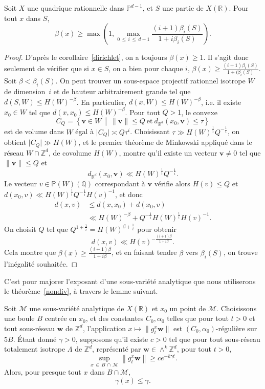 \documentclass[AHL,Unicode,longabstracts,francais,published]{cedram}
\newcommand{\abs}[1]{\lvert#1\rvert}
\newcommand{\norm}[1]{\lVert#1\rVert}
\newcommand{\R}{\mathbb{R}}
\newcommand{\Z}{\mathbb{Z}}
\newcommand{\Q}{\mathbb{Q}}
\newcommand{\PP}{\mathbb{P}}
\newcommand{\bw}{\mathbf{w}}
\newcommand{\bv}{\mathbf{v}}
\newcommand{\cM}{\mathcal{M}}
\begin{document}
\begin{prop}\label{dirichlet-fort}
Soit $X$ une quadrique rationnelle dans $\PP^{d-1}$, et $S$ une partie de $X(\R)$. Pour tout $x$ dans $S$,
\[
\beta(x) \geq \max\left(1,\max_{0\,\leq\,i\,\leq\,d-1} \frac{(i+1)\beta_i(S)}{1+i\beta_i(S)}\right).
\]
\end{prop}

\begin{proof}
D'après le corollaire~\ref{dirichlet}, on a toujours $\beta(x)\geq 1$. Il s'agit donc seulement de vérifier que si $x\in S$, on a bien pour chaque $i$, $\beta(x)\geq \frac{(i+1)\beta_i(S)}{1+i\beta_i(S)}$. Soit $\beta<\beta_i(S)$. On peut trouver un sous-espace projectif rationnel isotrope $W$ de dimension~$i$ et de hauteur arbitrairement grande tel que $d(S,W)\leq H(W)^{-\beta}$. En particulier, $d(x,W)\leq H(W)^{-\beta}$, i.e. il existe $x_0\in W$ tel que $d(x,x_0)\leq H(W)^{-\beta}$. Pour tout $Q>1$, le convexe
\[
C_Q=\left\{\bv\in W\ \middle|\ \norm{\bv}\leq Q\ \text{et}\ d_{\R^d}\left(x_0,\bv\right)\leq \tau\right\}
\]
est de volume dans $W$ égal à $\abs{C_Q}\asymp Q\tau^{i}$. Choisissant $\tau\gg H(W)^{\frac{1}{i}}Q^{-\frac{1}{i}}$, on obtient $\abs{C_Q}\gg H(W)$, et le premier théorème de Minkowski appliqué dans le réseau $W\cap\Z^d$, de covolume $H(W)$, montre qu'il existe un vecteur $\bv\neq 0$ tel que $\norm{\bv}\leq Q$ et
\[
d_{\R^d}\left(x_0,\bv\right)\ll H(W)^{\frac{1}{i}}Q^{-\frac{1}{i}}.
\]
Le vecteur $v\in\PP(W)(\Q)$ correspondant à $\bv$ vérifie alors $H(v)\leq Q$ et $d(x_0,v)\ll H(W)^{\frac{1}{i}}Q^{-\frac{1}{i}}H(v)^{-1}$, et donc
\begin{align*}
d(x,v) & \leq d\left(x,x_0\right) + d\left(x_0,v\right)\\
& \ll H(W)^{-\beta} + Q^{-\frac{1}{i}}H(W)^{\frac{1}{i}}H(v)^{-1}.
\end{align*}
On choisit $Q$ tel que $Q^{1+\frac{1}{i}}= H(W)^{\beta+\frac{1}{i}}$ pour obtenir
\[
d(x,v) \ll H(v)^{-\frac{(i+1)\beta}{1+i\beta}}.
\]
Cela montre que $\beta(x)\geq\frac{(i+1)\beta}{1+i\beta}$, et en faisant tendre $\beta$ vers $\beta_i(S)$, on trouve l'inégalité souhaitée.
\end{proof}

C'est pour majorer l'exposant d'une sous-variété analytique que nous utiliserons le théorème~\ref{nondiv}, à travers le lemme suivant.

\begin{lemm}\label{bc}
Soit $\cM$ une sous-variété analytique de $X(\R)$ et $x_0$ un point de $\cM$. Choisissons une boule $B$ centrée en $x_0$, et des constantes $C_0,\alpha_0$ telles que pour tout $t>0$ et tout sous-réseau $\bw$ de $\Z^d$, l'application $x\mapsto\|g_t^x\bw\|$ est $(C_0,\alpha_0)$-régulière sur $5B$. Étant donné $\gamma>0$, supposons qu'il existe $c>0$ tel que pour tout sous-réseau totalement isotrope $\Lambda$ de $\Z^d$, représenté par $\bw\in\wedge^k\Z^d$, pour tout $t>0$,
\[
\sup_{x\,\in\,B\,\cap\,\cM}\left\|g_t^x\bw\right\| \geq c e^{-k \gamma t}.
\]
Alors, pour presque tout $x$ dans $B\cap\cM$,
\[
\gamma(x) \leq \gamma.
\]
\end{lemm}
\end{document}

